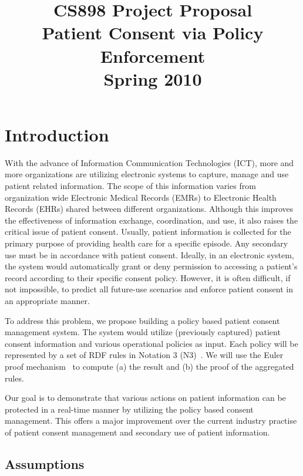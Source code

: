 \documentclass[conference]{IEEEtran}
\begin{document}
\title{CS898 Project Proposal \\ Patient Consent via Policy Enforcement \\Spring 2010}


\author{
}

\maketitle

\section{Introduction}
With the advance of Information Communication Technologies (ICT), more and more organizations are utilizing electronic systems to capture, manage and use patient related information.  The scope of this information varies from organization wide Electronic Medical Records (EMRs) to Electronic Health Records (EHRs) shared between different organizations.  Although this improves the effectiveness of information exchange, coordination, and use, it also raises the critical issue of patient consent. Usually, patient information is collected for the primary purpose of providing health care for a specific episode. Any secondary use must be in accordance with patient consent. Ideally, in an electronic system, the system would automatically grant or deny permission to accessing a patient's record according to their specific consent policy. However, it is often difficult, if not impossible, to predict all future-use scenarios and enforce patient consent in an appropriate manner.

To address this problem, we propose building a policy based patient consent management system. The system would utilize (previously captured) patient consent information and various operational policies as input. Each policy will be represented by a set of RDF rules in Notation 3 (N3)~\cite{N3not}.  We will use the Euler proof mechanism~\cite{eurlorprf} to compute (a) the result and (b) the proof of the aggregated rules.  

Our goal is to demonstrate that various actions on patient information can be protected in a real-time manner by utilizing the policy based consent management. This offers a major improvement over the current industry practise of patient consent management and secondary use of patient information.

\subsection{Assumptions}
\end{document}
